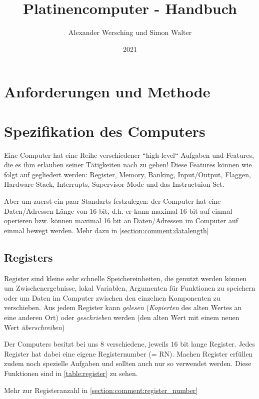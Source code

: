 \documentclass{scrartcl}
\begin{document}
\title{Platinencomputer - Handbuch}
\author{Alexander Wersching und Simon Walter}
\date{2021}
\maketitle
\newpage


\tableofcontents
\newpage

\section{Anforderungen und Methode}

\section{Spezifikation des Computers}
Eine Computer hat eine Reihe verschiedener ``high-level`` Aufgaben und Features, die es ihm erlauben seiner Tätigkeiten nach zu gehen! 
Diese Features können wie folgt auf gegliedert werden: Register, Memory, Banking, Input/Output, Flaggen, Hardware Stack, Interrupts, Supervisor-Mode und das Instructuion Set.

Aber um zuerst ein paar Standarts festzulegen: der Computer hat eine Daten/Adressen Länge von 16 bit, d.h. er kann maximal 16 bit auf einmal operieren bzw. können maximal 16 bit an Daten/Adressen im Computer auf einmal bewegt werden. Mehr dazu in \autoref{section:comment:datalength}



\subsection{Registers}
Register sind kleine sehr schnelle Speichereinheiten, die genutzt werden können um Zwischenergebnisse, lokal Variablen, Argumenten für Funktionen zu speichern oder um Daten im Computer zwischen den einzelnen Komponenten zu verschieben. Aus jedem Register kann \emph{gelesen} (\emph{Kopierten} des alten Wertes an eine anderen Ort) oder \emph{geschrieben} werden (den alten Wert mit einem neuen Wert \emph{überschreiben})

Der Computers besitzt bei uns $8$ verschiedene, jeweils $16$ bit lange Register. Jedes Register hat dabei eine eigene Registernumber (= RN). Machen Register erfüllen zudem noch spezielle Aufgaben und sollten auch nur so verwendet werden. Diese Funktionen sind in \autoref{table:register} zu sehen.

Mehr zur Registeranzahl in \autoref{section:comment:register_number}
\end{document}
